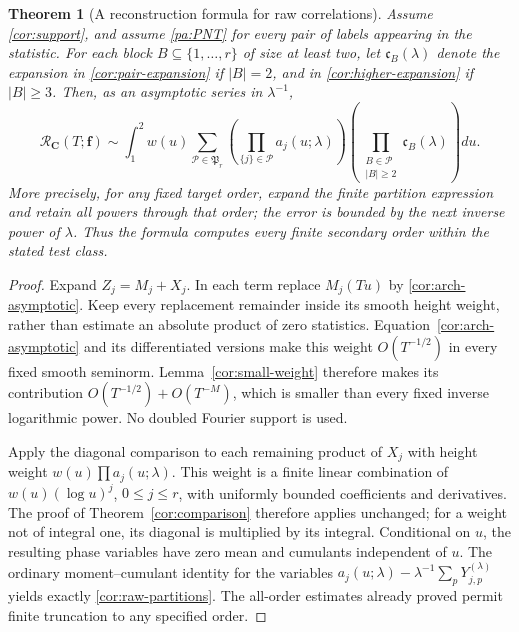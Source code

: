 \documentclass[11pt,reqno]{amsart}
\numberwithin{equation}{section}
\newtheorem{theorem}{Theorem}[section]
\theoremstyle{definition}
\theoremstyle{remark}
\begin{document}
\begin{theorem}[A reconstruction formula for raw correlations]\label{cor:raw-theorem}
Assume \eqref{cor:support}, and assume \eqref{pa:PNT} for every pair of labels appearing in the statistic. For each block $B\subseteq\{1,\ldots,r\}$ of size at least two, let $\mathfrak c_B(\lambda)$ denote the expansion in \eqref{cor:pair-expansion} if $|B|=2$, and in \eqref{cor:higher-expansion} if $|B|\ge3$. Then, as an asymptotic series in $\lambda^{-1}$,
\begin{equation}\mathcal R_{\boldsymbol C}(T;\boldsymbol f)
\sim\int_1^2w(u)\sum_{\mathcal P\in\mathfrak P_r}
\left(\prod_{\{j\}\in\mathcal P}a_j(u;\lambda)\right)
\left(\prod_{\substack{B\in\mathcal P\\|B|\ge2}}\mathfrak c_B(\lambda)\right)du.
\label{cor:raw-partitions}\end{equation}
More precisely, for any fixed target order, expand the finite partition expression and retain all powers through that order; the error is bounded by the next inverse power of $\lambda$. Thus the formula computes every finite secondary order within the stated test class.
\end{theorem}
\begin{proof}
Expand $Z_j=M_j+X_j$. In each term replace $M_j(Tu)$ by \eqref{cor:arch-asymptotic}. Keep every replacement remainder inside its smooth height weight, rather than estimate an absolute product of zero statistics. Equation~\eqref{cor:arch-asymptotic} and its differentiated versions make this weight $O(T^{-1/2})$ in every fixed smooth seminorm. Lemma~\ref{cor:small-weight} therefore makes its contribution $O(T^{-1/2})+O(T^{-M})$, which is smaller than every fixed inverse logarithmic power. No doubled Fourier support is used.

Apply the diagonal comparison to each remaining product of $X_j$ with height weight $w(u)\prod a_j(u;\lambda)$. This weight is a finite linear combination of $w(u)(\log u)^j$, $0\le j\le r$, with uniformly bounded coefficients and derivatives. The proof of Theorem~\ref{cor:comparison} therefore applies unchanged; for a weight not of integral one, its diagonal is multiplied by its integral. Conditional on $u$, the resulting phase variables have zero mean and cumulants independent of $u$. The ordinary moment--cumulant identity for the variables $a_j(u;\lambda)-\lambda^{-1}\sum_pY_{j,p}^{(\lambda)}$ yields exactly \eqref{cor:raw-partitions}. The all-order estimates already proved permit finite truncation to any specified order.
\end{proof}
\end{document}
